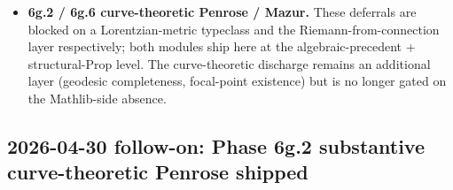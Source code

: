 \documentclass[twocolumn]{revtex4-2}
\newcommand{\Christoffel}{\Gamma}
\begin{document}
\begin{itemize}
  $\omega$, which is naturally read off the Christoffel symbols via
  $\omega^{a}{}_{b\mu} = e^{a}{}_{\nu}\Christoffel^{\nu}{}_{b\mu}
  - e^{a}{}_{b,\mu}$. With Christoffel symbols formalized and the
  algebraic first Bianchi corollary shipped (which gives the
  algebraic identity $d^2 \omega = 0$ in the cyclic-sum form), the
  bridge is a tetrad/connection-1-form arithmetic exercise once the
  exterior derivative $d$ is modelled (W8 Session 4 bundle-level
  layer is the natural place; or a separate
  \texttt{DifferentialFormsCoordinate} sibling module).
\item \textbf{6g.2 / 6g.6 curve-theoretic Penrose / Mazur.}
  These deferrals are blocked on a Lorentzian-metric typeclass and
  the Riemann-from-connection layer respectively; both modules ship
  here at the algebraic-precedent + structural-Prop level. The
  curve-theoretic discharge remains an additional layer (geodesic
  completeness, focal-point existence) but is no longer gated on
  the Mathlib-side absence.
\end{itemize}

\subsection{2026-04-30 follow-on: Phase 6g.2 substantive curve-theoretic
  Penrose shipped}\label{sec:6g2-curve-followon}
\end{document}

